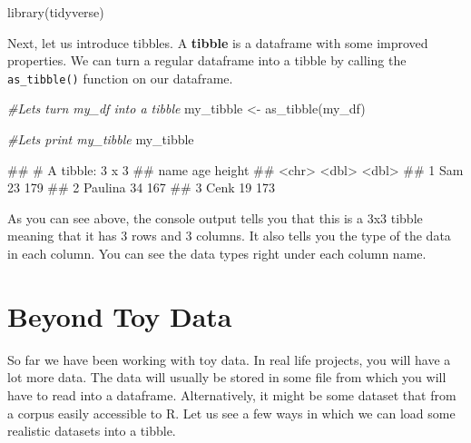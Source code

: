 \documentclass[
]{book}
\newenvironment{Shaded}{\begin{snugshade}}{\end{snugshade}}
\newcommand{\CommentTok}[1]{\textcolor[rgb]{0.56,0.35,0.01}{\textit{#1}}}
\newcommand{\FunctionTok}[1]{\textcolor[rgb]{0.00,0.00,0.00}{#1}}
\newcommand{\NormalTok}[1]{#1}
\newcommand{\OtherTok}[1]{\textcolor[rgb]{0.56,0.35,0.01}{#1}}
\begin{document}
\begin{Shaded}
\begin{Highlighting}[]
\FunctionTok{library}\NormalTok{(tidyverse)}
\end{Highlighting}
\end{Shaded}

Next, let us introduce tibbles. A \textbf{tibble} is a dataframe with some improved properties. We can turn a regular dataframe into a tibble by calling the \texttt{as\_tibble()} function on our dataframe.

\begin{Shaded}
\begin{Highlighting}[]
\CommentTok{\#Let\textquotesingle{}s turn my\_df into a tibble}
\NormalTok{my\_tibble }\OtherTok{\textless{}{-}} \FunctionTok{as\_tibble}\NormalTok{(my\_df)}

\CommentTok{\#Let\textquotesingle{}s print my\_tibble}
\NormalTok{my\_tibble}
\end{Highlighting}
\end{Shaded}

\begin{Shaded}
\begin{Highlighting}[]
\NormalTok{\#\# \# A tibble: 3 x 3}
\NormalTok{\#\#   name      age height}
\NormalTok{\#\#   \textless{}chr\textgreater{}   \textless{}dbl\textgreater{}  \textless{}dbl\textgreater{}}
\NormalTok{\#\# 1 Sam        23    179}
\NormalTok{\#\# 2 Paulina    34    167}
\NormalTok{\#\# 3 Cenk       19    173}
\end{Highlighting}
\end{Shaded}

As you can see above, the console output tells you that this is a 3x3 tibble meaning that it has 3 rows and 3 columns. It also tells you the type of the data in each column. You can see the data types right under each column name.

\hypertarget{beyond-toy-data}{%
\section{Beyond Toy Data}\label{beyond-toy-data}}

So far we have been working with toy data. In real life projects, you will have a lot more data. The data will usually be stored in some file from which you will have to read into a dataframe. Alternatively, it might be some dataset that from a corpus easily accessible to R. Let us see a few ways in which we can load some realistic datasets into a tibble.
\end{document}
